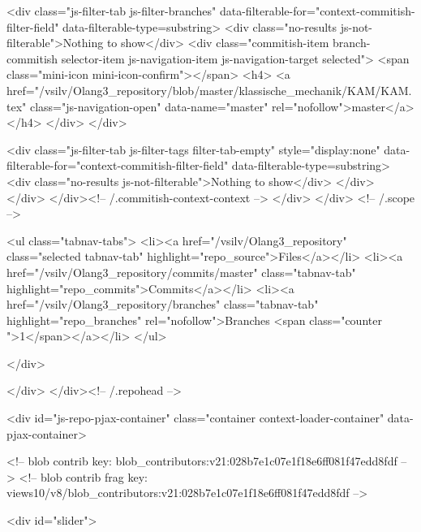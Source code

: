          <div class="js-filter-tab js-filter-branches" data-filterable-for="context-commitish-filter-field" data-filterable-type=substring>
            <div class="no-results js-not-filterable">Nothing to show</div>
              <div class="commitish-item branch-commitish selector-item js-navigation-item js-navigation-target selected">
                <span class="mini-icon mini-icon-confirm"></span>
                <h4>
                    <a href="/vsilv/Olang3_repository/blob/master/klassische_mechanik/KAM/KAM.tex" class="js-navigation-open" data-name="master" rel="nofollow">master</a>
                </h4>
              </div>
          </div>

            <div class="js-filter-tab js-filter-tags filter-tab-empty" style="display:none" data-filterable-for="context-commitish-filter-field" data-filterable-type=substring>
              <div class="no-results js-not-filterable">Nothing to show</div>
            </div>
        </div>
      </div><!-- /.commitish-context-context -->
    </div>
  </div> <!-- /.scope -->

  <ul class="tabnav-tabs">
    <li><a href="/vsilv/Olang3_repository" class="selected tabnav-tab" highlight="repo_source">Files</a></li>
    <li><a href="/vsilv/Olang3_repository/commits/master" class="tabnav-tab" highlight="repo_commits">Commits</a></li>
    <li><a href="/vsilv/Olang3_repository/branches" class="tabnav-tab" highlight="repo_branches" rel="nofollow">Branches <span class="counter ">1</span></a></li>
  </ul>

</div>

  
  
  


            
          </div>
        </div><!-- /.repohead -->

        <div id="js-repo-pjax-container" class="container context-loader-container" data-pjax-container>
          


<!-- blob contrib key: blob_contributors:v21:028b7e1c07e1f18e6ff081f47edd8fdf -->
<!-- blob contrib frag key: views10/v8/blob_contributors:v21:028b7e1c07e1f18e6ff081f47edd8fdf -->

<div id="slider">


